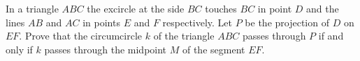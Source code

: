 In a triangle $ABC$ the excircle at the side $BC$ touches $BC$ in point $D$ and the lines $AB$ and $AC$ in points $E$ and $F$ respectively. Let $P$ be the projection of $D$ on $EF$. Prove that the circumcircle $k$ of the triangle $ABC$ passes through $P$ if and only if $k$ passes through the midpoint $M$ of the segment $EF$.